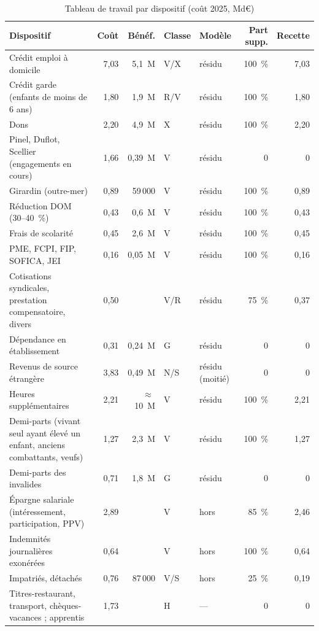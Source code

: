 \begin{table}[h]\centering\scriptsize\setlength{\tabcolsep}{2.5pt}
\caption{Tableau de travail par dispositif (coût 2025, Md€)}\label{tab:ircsg4_disp}
\begin{tabular}{p{4.6cm}rrp{0.7cm}p{1.2cm}rr}\hline
Dispositif & Coût & Bénéf. & Classe & Modèle & Part supp. & Recette \\ \hline
Crédit emploi à domicile & 7{,}03 & 5{,}1~M & V/X & résidu & 100~\% & 7{,}03 \\
Crédit garde (enfants de moins de 6 ans) & 1{,}80 & 1{,}9~M & R/V & résidu & 100~\% & 1{,}80 \\
Dons & 2{,}20 & 4{,}9~M & X & résidu & 100~\% & 2{,}20 \\
Pinel, Duflot, Scellier (engagements en cours) & 1{,}66 & 0{,}39~M & V & résidu & 0 & 0 \\
Girardin (outre-mer) & 0{,}89 & 59\,000 & V & résidu & 100~\% & 0{,}89 \\
Réduction DOM (30--40~\%) & 0{,}43 & 0{,}6~M & V & résidu & 100~\% & 0{,}43 \\
Frais de scolarité & 0{,}45 & 2{,}6~M & V & résidu & 100~\% & 0{,}45 \\
PME, FCPI, FIP, SOFICA, JEI & 0{,}16 & 0{,}05~M & V & résidu & 100~\% & 0{,}16 \\
Cotisations syndicales, prestation compensatoire, divers & 0{,}50 & & V/R & résidu & 75~\% & 0{,}37 \\
Dépendance en établissement & 0{,}31 & 0{,}24~M & G & résidu & 0 & 0 \\
Revenus de source étrangère & 3{,}83 & 0{,}49~M & N/S & résidu (moitié) & 0 & 0 \\
Heures supplémentaires & 2{,}21 & $\approx$\,10~M & V & résidu & 100~\% & 2{,}21 \\
Demi-parts (vivant seul ayant élevé un enfant, anciens combattants, veufs) & 1{,}27 & 2{,}3~M & V & résidu & 100~\% & 1{,}27 \\
Demi-parts des invalides & 0{,}71 & 1{,}8~M & G & résidu & 0 & 0 \\
Épargne salariale (intéressement, participation, PPV) & 2{,}89 & & V & hors & 85~\% & 2{,}46 \\
Indemnités journalières exonérées & 0{,}64 & & V & hors & 100~\% & 0{,}64 \\
Impatriés, détachés & 0{,}76 & 87\,000 & V/S & hors & 25~\% & 0{,}19 \\
Titres-restaurant, transport, chèques-vacances ; apprentis & 1{,}73 & & H & --- & 0 & 0 \\

\end{tabular}
\end{table}
